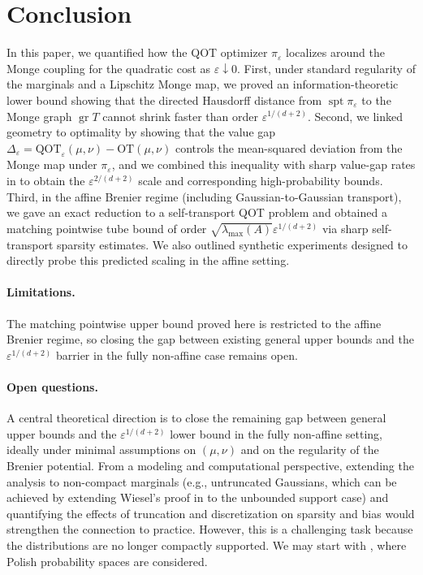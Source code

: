 \documentclass{article}
\theoremstyle{plain}
\theoremstyle{definition}
\theoremstyle{remark}
\numberwithin{equation}{section}
\DeclareMathOperator{\spt}{spt}
\DeclareMathOperator{\gr}{gr}
\newcommand{\OT}{\mathrm{OT}}
\newcommand{\QOT}{\mathrm{QOT}}
\begin{document}
\section{Conclusion}\label{sec:conclusion}
In this paper, we quantified how the QOT optimizer $\pi_\varepsilon$ localizes around the Monge coupling for the quadratic cost as $\varepsilon\downarrow0$.
First, under standard regularity of the marginals and a Lipschitz Monge map, we proved an information-theoretic lower bound showing that the directed Hausdorff distance from $\spt\pi_\varepsilon$ to the Monge graph $\gr T$ cannot shrink faster than order $\varepsilon^{1/(d+2)}$.
Second, we linked geometry to optimality by showing that the value gap $\Delta_\varepsilon=\QOT_\varepsilon(\mu,\nu)-\OT(\mu,\nu)$ controls the mean-squared deviation from the Monge map under $\pi_\varepsilon$, and we combined this inequality with sharp value-gap rates in \citet{eckstein2024convergence} to obtain the $\varepsilon^{2/(d+2)}$ scale and corresponding high-probability bounds.
Third, in the affine Brenier regime (including Gaussian-to-Gaussian transport), we gave an exact reduction to a self-transport QOT problem and obtained a matching pointwise tube bound of order $\sqrt{\lambda_{\max}(A)}\varepsilon^{1/(d+2)}$ via sharp self-transport sparsity estimates.
We also outlined synthetic experiments designed to directly probe this predicted scaling in the affine setting.

\paragraph{Limitations.} 
The matching pointwise upper bound proved here is restricted to the affine Brenier regime, so closing the gap between existing general upper bounds and the $\varepsilon^{1/(d+2)}$ barrier in the fully non-affine case remains open.

\paragraph{Open questions.} 
A central theoretical direction is to close the remaining gap between general upper bounds and the $\varepsilon^{1/(d+2)}$ lower bound in the fully non-affine setting, ideally under minimal assumptions on $(\mu,\nu)$ and on the regularity of the Brenier potential.
From a modeling and computational perspective, extending the analysis to non-compact marginals (e.g., untruncated Gaussians, which can be achieved by extending Wiesel's proof in \citet{wiesel2025sparsity} to the unbounded support case) and quantifying the effects of truncation and discretization on sparsity and bias would strengthen the connection to practice.
However, this is a challenging task because the distributions are no longer compactly supported.
We may start with \citet{nutz2025quadratically}, where Polish probability spaces are considered.
\end{document}
